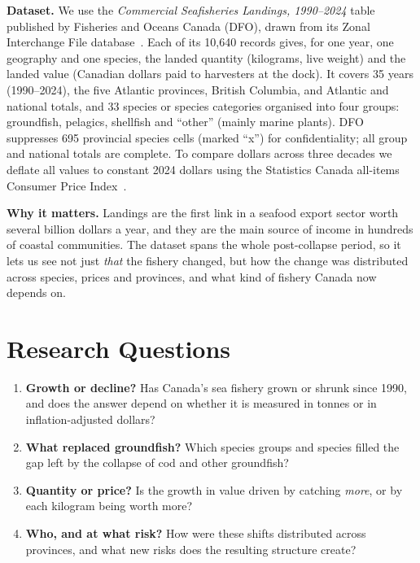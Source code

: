 \documentclass[12pt,letterpaper]{article}
\begin{document}
\textbf{Dataset.} We use the \emph{Commercial Seafisheries Landings, 1990--2024} table published by
Fisheries and Oceans Canada (DFO), drawn from its Zonal Interchange File database~\cite{dfo2025}.
Each of its 10{,}640 records gives, for one year, one geography and one species, the landed
quantity (kilograms, live weight) and the landed value (Canadian dollars paid to harvesters at
the dock). It covers 35 years (1990--2024), the five Atlantic provinces, British Columbia, and
Atlantic and national totals, and 33 species or species categories organised into four groups:
groundfish, pelagics, shellfish and ``other'' (mainly marine plants). DFO suppresses 695
provincial species cells (marked ``x'') for confidentiality; all group and national totals are
complete. To compare dollars across three decades we deflate all values to constant 2024 dollars
using the Statistics Canada all-items Consumer Price Index~\cite{statcan_cpi}.

\textbf{Why it matters.} Landings are the first link in a seafood export sector worth several
billion dollars a year, and they are the main source of income in hundreds of coastal
communities. The dataset spans the whole post-collapse period, so it lets us see not just
\emph{that} the fishery changed, but how the change was distributed across species, prices and provinces,
and what kind of fishery Canada now depends on.

\section{Research Questions}

\begin{enumerate}[label=\textbf{Q\arabic*.}, leftmargin=2.4em]
  \item \textbf{Growth or decline?} Has Canada's sea fishery grown or shrunk since 1990, and does the
        answer depend on whether it is measured in tonnes or in inflation-adjusted dollars?
  \item \textbf{What replaced groundfish?} Which species groups and species filled the gap left by
        the collapse of cod and other groundfish?
  \item \textbf{Quantity or price?} Is the growth in value driven by catching \emph{more}, or by each
        kilogram being worth more?
  \item \textbf{Who, and at what risk?} How were these shifts distributed across provinces, and
        what new risks does the resulting structure create?
\end{enumerate}
\end{document}
